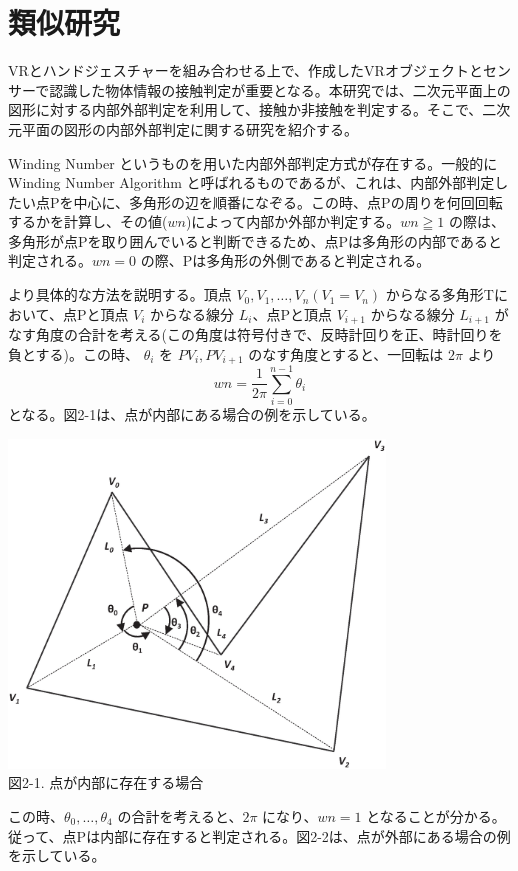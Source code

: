 \section{類似研究}
VRとハンドジェスチャーを組み合わせる上で、作成したVRオブジェクトとセンサーで認識した物体情報の接触判定が重要となる。本研究では、二次元平面上の図形に対する内部外部判定を利用して、接触か非接触を判定する。そこで、二次元平面の図形の内部外部判定に関する研究を紹介する。

Winding Number というものを用いた内部外部判定方式\cite{タグ3}が存在する。一般的に Winding Number Algorithm と呼ばれるものであるが、これは、内部外部判定したい点Pを中心に、多角形の辺を順番になぞる。この時、点Pの周りを何回回転するかを計算し、その値($wn$)によって内部か外部か判定する。$wn \geqq 1$ の際は、多角形が点Pを取り囲んでいると判断できるため、点Pは多角形の内部であると判定される。$wn = 0$ の際、Pは多角形の外側であると判定される。

より具体的な方法を説明する。頂点 $V_0, V_1, \ldots, V_n (V_1 = V_n)$ からなる多角形Tにおいて、点Pと頂点 $V_i$ からなる線分 $L_i$、点Pと頂点 $V_{i+1}$ からなる線分 $L_{i+1}$ がなす角度の合計を考える(この角度は符号付きで、反時計回りを正、時計回りを負とする)。この時、 $\theta_i$ を $PV_i, PV_{i+1}$ のなす角度とすると、一回転は $2\pi$ より
\[
wn = \frac{1}{2\pi}\sum_{i=0}^{n-1}\theta_i
\]
となる。図2-1は、点が内部にある場合の例を示している。

\begin{center}
  \includegraphics[width=10cm]{wn_inside.eps} \\
 \vspace{1mm}
  図2-1. 点が内部に存在する場合
\end{center}

この時、$\theta_0, \ldots, \theta_4$ の合計を考えると、$2\pi$ になり、$wn = 1$ となることが分かる。従って、点Pは内部に存在すると判定される。図2-2は、点が外部にある場合の例を示している。

